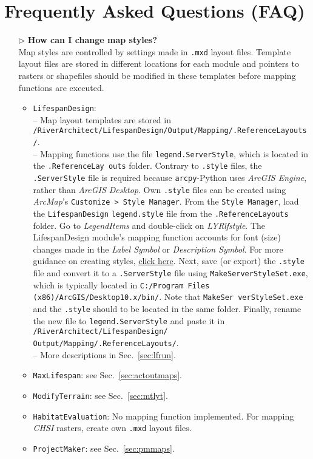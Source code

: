 \newpage
\part{Frequently Asked Questions (FAQ)} \label{part:faq}

\begin{itemize}	
	\item[$\triangleright$] \textbf{How can I change map styles?}\\
	Map styles are controlled by settings made in \texttt{.mxd} layout files. Template layout files are stored in different locations for each module and pointers to rasters or shapefiles should be modified in these templates before mapping functions are executed.
	\begin{itemize}
		\item \texttt{LifespanDesign}:\\
		-- Map layout templates are stored in \texttt{/RiverArchitect/LifespanDesign/Output/Mapping/.ReferenceLayouts/}.\\
		-- Mapping functions use the file \texttt{legend.ServerStyle}, which is located in the \texttt{.ReferenceLay outs} folder. Contrary to \texttt{.style} files, the \texttt{.ServerStyle} file is required because \texttt{arcpy}-Python uses \textit{ArcGIS Engine}, rather than \textit{ArcGIS Desktop}. Own \texttt{.style} files can be created using \textit{ArcMap}'s \texttt{Customize > Style Manager}. From the \texttt{Style Manager}, load the \texttt{LifespanDesign} \texttt{legend.style} file from the \texttt{.ReferenceLayouts} folder. Go to \textit{LegendItems} and double-click on \textit{LYR{\myUnderscore}lf{\myUnderscore}style}. The LifespanDesign module's mapping function accounts for font (size) changes made in the \textit{Label Symbol} or \textit{Description Symbol}. For more guidance on creating styles, \href{http://desktop.arcgis.com/en/arcmap/latest/map/styles-and-symbols/creating-new-styles.htm}{click here}. Next, save (or export) the \texttt{.style} file and convert it to a \texttt{.ServerStyle} file using \texttt{MakeServerStyleSet.exe}, which is typically located in \texttt{C:/Program Files (x86)/ArcGIS/Desktop10.x/bin/}. Note that \texttt{MakeSer verStyleSet.exe} and the \texttt{.style} should to be located in the same folder. Finally, rename the new file to \texttt{legend.ServerStyle} and paste it in \texttt{/RiverArchitect/LifespanDesign/ Output/Mapping/.ReferenceLayouts/}.\\
		-- More descriptions in Sec.~\ref{sec:lfrun}.\\
		\item \texttt{MaxLifespan}: see Sec.~\ref{sec:actoutmaps}.
		\item \texttt{ModifyTerrain}: see Sec.~\ref{sec:mtlyt}.
		\item \texttt{HabitatEvaluation}: No mapping function implemented. For mapping \textit{CHSI} rasters, create own \texttt{.mxd} layout files.
		\item \texttt{ProjectMaker}: see Sec.~\ref{sec:pmmaps}.
	\end{itemize}
	

\end{itemize}
